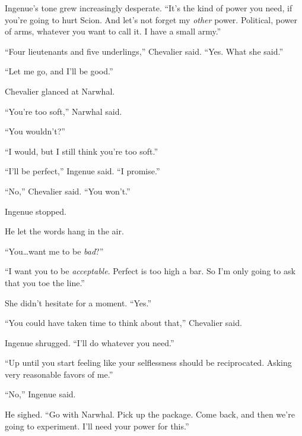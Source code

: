 Ingenue's tone grew increasingly desperate.  ``It's the kind of power you need, if you're going to hurt Scion.  And let's not forget my \emph{other} power.  Political, power of arms, whatever you want to call it.  I have a small army.''



``Four lieutenants and five underlings,'' Chevalier said.  ``Yes.  What she said.''



``Let me go, and I'll be good.''



Chevalier glanced at Narwhal.



``You're too soft,'' Narwhal said.



``You wouldn't?''



``I would, but I still think you're too soft.''



``I'll be perfect,'' Ingenue said.  ``I promise.''



``No,'' Chevalier said.  ``You won't.''



Ingenue stopped.



He let the words hang in the air.



``You\ldots want me to be \emph{bad}?''



``I want you to be \emph{acceptable}.  Perfect is too high a bar.  So I'm only going to ask that you toe the line.''



She didn't hesitate for a moment.  ``Yes.''



``You could have taken time to think about that,'' Chevalier said.



Ingenue shrugged.  ``I'll do whatever you need.''



``Up until you start feeling like your selflessness should be reciprocated.  Asking very reasonable favors of me.''



``No,'' Ingenue said.



He sighed.  ``Go with Narwhal.  Pick up the package.  Come back, and then we're going to experiment.  I'll need your power for this.''



